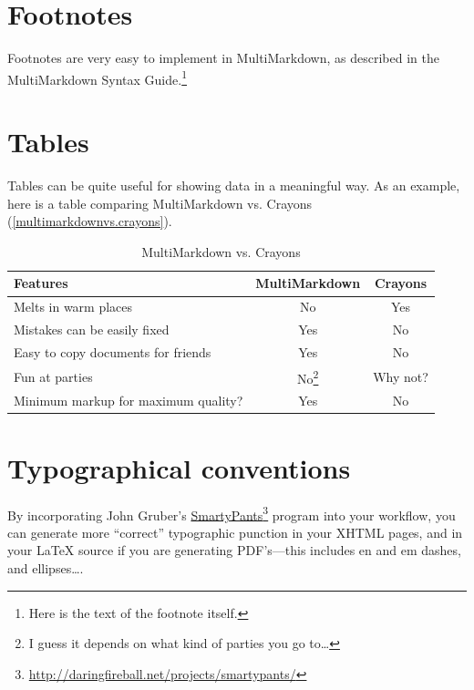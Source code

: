 \section{Footnotes}
\label{footnotes}

Footnotes are very easy to implement in MultiMarkdown, as described in the
MultiMarkdown Syntax Guide.\footnote{Here is the text of the footnote itself.}

\section{Tables}
\label{tables}

Tables can be quite useful for showing data in a meaningful way. As an
example, here is a table comparing MultiMarkdown vs. Crayons (\autoref{multimarkdownvs.crayons}).

\begin{table}[htbp]
\begin{minipage}{\linewidth}
\setlength{\tymax}{0.5\linewidth}
\centering
\small
\caption{MultiMarkdown vs. Crayons}
\label{multimarkdownvs.crayons}
\begin{tabular}{@{}lcc@{}} \toprule
Features&MultiMarkdown&Crayons\\
\midrule
Melts in warm places&No&Yes\\
Mistakes can be easily fixed&Yes&No\\
Easy to copy documents for friends&Yes&No\\
Fun at parties&No\footnote{I guess it depends on what kind of parties you go to{\ldots}}&Why not?\\

\midrule
Minimum markup for maximum quality?&Yes&No\\

\bottomrule

\end{tabular}
\end{minipage}
\end{table}


\section{Typographical conventions}
\label{typographicalconventions}

By incorporating John Gruber's \href{http://daringfireball.net/projects/smartypants/}{SmartyPants}\footnote{\href{http://daringfireball.net/projects/smartypants/}{http:\slash \slash daringfireball.net\slash projects\slash smartypants\slash }} program into your workflow, you
can generate more ``correct'' typographic punction in your XHTML pages, and in
your LaTeX source if you are generating PDF's---this includes en and em
dashes, and ellipses{\ldots}.

